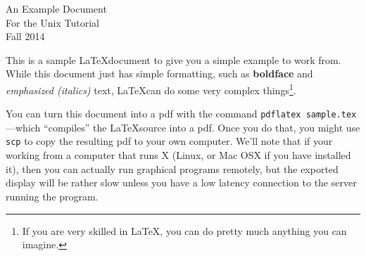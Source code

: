 \documentclass[12pt]{article}
\begin{document}
\begin{center}
{\Large 
An Example Document\\
For the Unix Tutorial\\
Fall 2014\\ 
}
\end{center}

This is a sample \LaTeX document to give you a simple example to work from.
While this document just has simple formatting, such as \textbf{boldface} and
\emph{emphasized (italics)} text, \LaTeX can do some very complex things\footnote{
If you are very skilled in \LaTeX, you can do pretty much anything you can imagine.}.

You can turn this document into a pdf with the command \verb+pdflatex sample.tex+---which
``compiles'' the \LaTeX source into a pdf.  Once you do that, you might use \verb+scp+
to copy the resulting pdf to your own computer.  We'll note that if your working
from a computer that runs X (Linux, or Mac OSX if you have installed it), then you can
actually run graphical programs remotely, but the exported display will be rather slow
unless you have a low latency connection to the server running the program.
\end{document}
